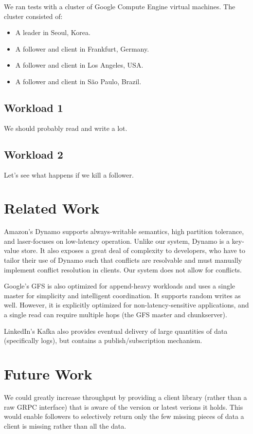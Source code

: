 \documentclass[11pt,english,twocolumn]{article}
\begin{document}
We ran tests with a cluster of Google Compute Engine virtual
machines. The cluster consisted of:

\begin{itemize}
	\item A leader in Seoul, Korea.
	\item A follower and client in Frankfurt, Germany.
	\item A follower and client in Los Angeles, USA.
	\item A follower and client in São Paulo, Brazil.
\end{itemize}

\subsection{Workload 1}
We should probably read and write a lot.

\subsection{Workload 2}
Let's see what happens if we kill a follower.

\section{Related Work}
Amazon's Dynamo \cite{Dynamo} supports always-writable semantics, high partition
tolerance, and laser-focuses on low-latency operation. Unlike our system, Dynamo
is a key-value store. It also exposes a great deal of complexity to developers,
who have to tailor their use of Dynamo such that conflicts are resolvable and
must manually implement conflict resolution in clients. Our system does not
allow for conflicts.

Google's GFS \cite{GFS} is also optimized for append-heavy workloads and uses a
single master for simplicity and intelligent coordination. It supports random
writes as well. However, it is explicitly optimized for non-latency-sensitive
applications, and a single read can require multiple hops (the GFS master and
chunkserver).

LinkedIn's Kafka \cite{Kafka} also provides eventual delivery of large
quantities of data (specifically logs), but contains a publish/subscription
mechanism.

\section{Future Work}
We could greatly increase throughput by providing a client library (rather than
a raw GRPC interface) that is aware of the version or latest verions it holds.
This would enable followers to selectively return only the few missing pieces of
data a client is missing rather than all the data.
\end{document}
